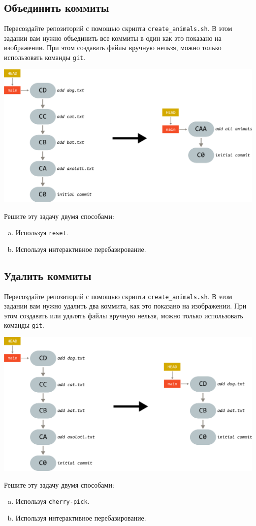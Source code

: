 \documentclass{article}
\begin{document}
\subsection{Объединить коммиты}
Пересоздайте репозиторий с помощью скрипта \texttt{create\_animals.sh}.
В этом задании вам нужно объединить все коммиты в один как это показано на изображении. При этом создавать файлы вручную нельзя, можно только использовать команды \texttt{git}.
\begin{center}
\includegraphics[scale=0.8]{../images/squash_animals.png}
\end{center}
Решите эту задачу двумя способами:
\begin{enumerate}[(a)]
\item Используя \texttt{reset}.
\item Используя интерактивное перебазирование.
\end{enumerate}

\subsection{Удалить коммиты}
Пересоздайте репозиторий с помощью скрипта \texttt{create\_animals.sh}.
В этом задании вам нужно удалить два коммита, как это показано на изображении. При этом создавать или удалять файлы вручную нельзя, можно только использовать команды \texttt{git}.
\begin{center}
\includegraphics[scale=0.8]{../images/delete_commits_animals.png}
\end{center}
Решите эту задачу двумя способами:
\begin{enumerate}[(a)]
\item Используя \texttt{cherry-pick}.
\item Используя интерактивное перебазирование.
\end{enumerate}
\end{document}

